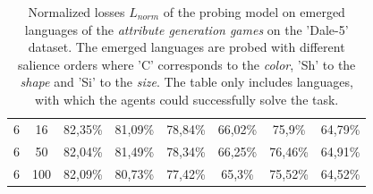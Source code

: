 \begin{table}[ht]
\begin{tabular}{cc|c|c|c|c|c|c}
        {6} & {16}  & {82,35\%}                & {81,09\%}                & {78,84\%}                & {66,02\%}                & {75,9\%}                 & {64,79\%}                \\
        {6} & {50}  & {82,04\%}                & {81,49\%}                & {78,34\%}                & {66,25\%}                & {76,46\%}                & {64,91\%}                \\
        {6} & {100} & {82,09\%}                & {80,73\%}                & {77,42\%}                & {65,3\%}                 & {75,52\%}                & {64,52\%}                \\
        \bottomrule
    \end{tabular}
    \caption{Normalized losses $L_{norm}$ of the probing model on emerged languages of the \emph{attribute generation games} on the 'Dale-5' dataset. The emerged languages are probed with different salience orders where 'C' corresponds to the \emph{color}, 'Sh' to the \emph{shape} and 'Si' to the \emph{size}. The table only includes languages, with which the agents could successfully solve the task.}
    \label{tab:probing:attribute-generator:dale-5}
\end{table}

